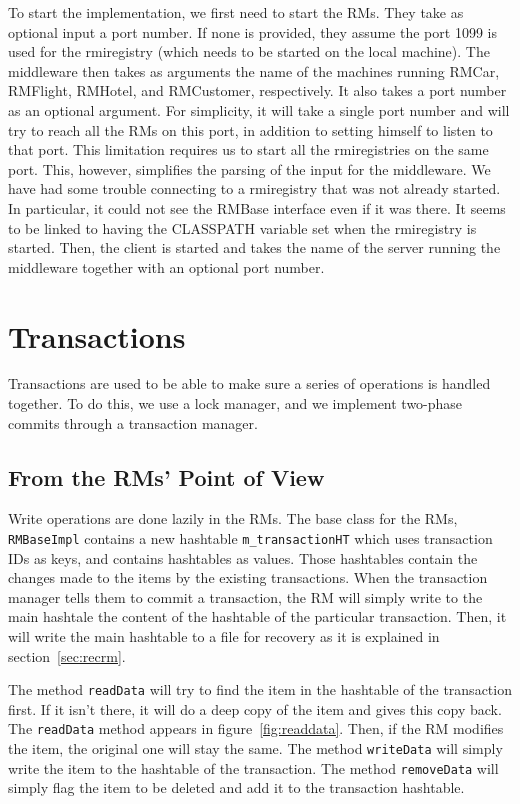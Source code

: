 \documentclass[12pt]{article}
\theoremstyle{plain}%
\theoremstyle{definition}
\theoremstyle{remark}
\newcommand{\java}[1]{{\lstinline!#1!}}
\begin{document}
To start the implementation, we first need to start the RMs. They take
as optional input a port number. If none is provided, they assume the
port 1099 is used for the rmiregistry (which needs to be started on
the local machine). The middleware then takes as arguments the name of
the machines running RMCar, RMFlight, RMHotel, and RMCustomer,
respectively. It also takes a port number as an optional argument. For
simplicity, it will take a single port number and will try to reach
all the RMs on this port, in addition to setting himself to listen to
that port. This limitation requires us to start all the rmiregistries
on the same port. This, however, simplifies the parsing of the input
for the middleware. We have had some trouble connecting to a
rmiregistry that was not already started. In particular, it could not
see the RMBase interface even if it was there. It seems to be linked to
having the CLASSPATH variable set when the rmiregistry is started.
Then, the client is started and takes the name of the server running
the middleware together with an optional port number.

\section{Transactions}

Transactions are used to be able to make sure a series of operations is 
handled together. To do this, we use a lock manager, and we implement
two-phase commits through a transaction manager.

\subsection{From the RMs' Point of View\label{sec:rm}}

Write operations are done lazily in the RMs. The base class for the RMs, 
\java{RMBaseImpl} contains a new hashtable \java{m_transactionHT} which 
uses transaction IDs as keys, and contains hashtables as values. Those 
hashtables contain the changes made to the items by the existing 
transactions. When the transaction manager tells them to commit a 
transaction, the RM will simply write to the main hashtale the content 
of the hashtable of the particular transaction. Then, it will write
the main hashtable to a file for recovery as it is explained in
section~\ref{sec:recrm}.

The method \java{readData} will try to find the item in the hashtable 
of the transaction first. If it isn't there, it will do a deep copy of 
the item and gives this copy back. The \java{readData} method appears
in figure~\ref{fig:readdata}. Then, if the RM modifies the item, 
the original one will stay the same. The method \java{writeData} will 
simply write the item to the hashtable of the transaction. The method 
\java{removeData} will simply flag the item to be deleted and add it 
to the transaction hashtable.
\end{document}
